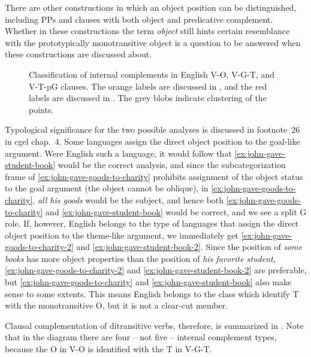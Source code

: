 \documentclass{article}
\newcommand*{\citechap}[1]{chap.~{#1}}
\newcommand*{\citefootnote}[1]{footnote~{#1}}
\newcommand*{\term}[1]{\emph{#1}}
\newcommand*{\corpus}[1]{\emph{#1}}
\begin{document}
There are other constructions in which an object position can be distinguished,
including PPs and clauses with both object and predicative complement. %
Whether in these constructions the term \term{object} still hints 
certain resemblance with the prototypically monotransitive object 
is a question to be answered when these constructions are discussed about.

\begin{figure}
    \centering
    
    \caption{Classification of internal complements in English V-O, V-G-T, and V-T-pG clauses.
    The orange labels are discussed in ,
    and the red labels are discussed in .
    The grey blobs indicate clustering of the points.}
    \label{fig:english-object}
\end{figure}

Typological significance for the two possible analyses is discussed in
\citefootnote{26} in \ac{cgel} \citechap{4}.
Some languages assign the direct object position to the goal-like argument.
Were English such a language, 
it would follow that \eqref{ex:john-gave-student-book} would be the correct analysis,
and since the subcategorization frame of \eqref{ex:john-gave-goods-to-charity} 
prohibits assignment of the object status to the goal argument
(the object cannot be oblique),
in \eqref{ex:john-gave-goods-to-charity},
\corpus{all his goods} would be the subject,
and hence both \eqref{ex:john-gave-goods-to-charity} and \eqref{ex:john-gave-student-book} 
would be correct,
and we see a split G role.
If, however, English belongs to the type of languages 
that assign the direct object position to the theme-like argument,
we immediately get \eqref{ex:john-gave-goods-to-charity-2} and \eqref{ex:john-gave-student-book-2}.
Since the position of \corpus{some books} has more object properties 
than the position of \corpus{his favorite student},
\eqref{ex:john-gave-goods-to-charity-2} and \eqref{ex:john-gave-student-book-2} are preferable,
but \eqref{ex:john-gave-goods-to-charity} and \eqref{ex:john-gave-student-book} also make sense 
to some extents.
This means English belongs to the class which identify T with the monotransitive O, 
but it is not a clear-cut member.

Clausal complementation of ditransitive verbs, therefore, is summarized in .
Note that in the diagram there are four -- not five -- internal complement types,
because the O in V-O is identified with the T in V-G-T.
\end{document}
